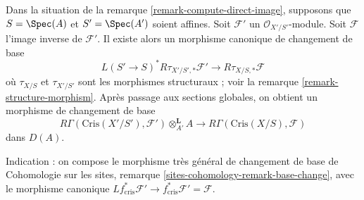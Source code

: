 \begin{remark}
\label{remark-base-change}
Dans la situation de la remarque \ref{remark-compute-direct-image},
supposons que $S = \Spec(A)$ et $S' = \Spec(A')$ soient affines.
Soit $\mathcal{F}'$ un $\mathcal{O}_{X'/S'}$-module.
Soit $\mathcal{F}$ l'image inverse de $\mathcal{F}'$.
Il existe alors un morphisme canonique de changement de base
$$
L(S' \to S)^*R\tau_{X'/S', *}\mathcal{F}'
\longrightarrow
R\tau_{X/S, *}\mathcal{F}
$$
où $\tau_{X/S}$ et $\tau_{X'/S'}$ sont les morphismes structuraux ; voir la
remarque \ref{remark-structure-morphism}. Après passage aux sections globales,
on obtient un morphisme de changement de base
\begin{equation}
\label{equation-base-change-map}
R\Gamma(\text{Cris}(X'/S'), \mathcal{F}') \otimes^\mathbf{L}_{A'} A
\longrightarrow
R\Gamma(\text{Cris}(X/S), \mathcal{F})
\end{equation}
dans $D(A)$.

\medskip\noindent
Indication : on compose le morphisme très général de changement de base de
Cohomologie sur les sites, remarque \ref{sites-cohomology-remark-base-change},
avec le morphisme canonique
$Lf_{\text{cris}}^*\mathcal{F}' \to
f_{\text{cris}}^*\mathcal{F}' = \mathcal{F}$.
\end{remark}

